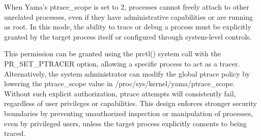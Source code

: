 \documentclass[12pt]{report}
\begin{document}
\begin{doublespace}
When Yama’s ptrace\_scope is set to 2, processes cannot freely attach to other unrelated processes, even if they have administrative capabilities or are running as root. In this mode, the ability to trace or debug a process must be explicitly granted by the target process itself or configured through system-level controls.

This permission can be granted using the prctl() system call with the PR\_SET\_PTRACER option, allowing a specific process to act as a tracer. Alternatively, the system administrator can modify the global ptrace policy by lowering the ptrace\_scope value in /proc/sys/kernel/yama/ptrace\_scope. Without such explicit authorization, ptrace attempts will consistently fail, regardless of user privileges or capabilities. This design enforces stronger security boundaries by preventing unauthorized inspection or manipulation of processes, even by privileged users, unless the target process explicitly consents to being traced.

\end{doublespace} 	\fontsize{12pt}{14pt} \selectfont
\end{document}
